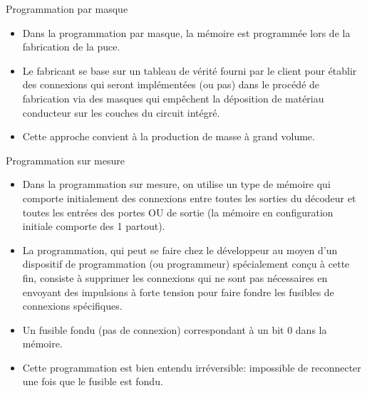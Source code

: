 \documentclass[presentation]{beamer}
\begin{document}
\begin{frame}[label={sec:org1bb626f}]{Programmation par masque}
\begin{itemize}
\item Dans la \alert{programmation par masque}, la mémoire est programmée lors de la fabrication de la puce.

\item Le fabricant se base sur un tableau de vérité fourni par le client pour établir des connexions qui seront implémentées (ou pas) dans le procédé de fabrication via des masques qui empêchent la déposition de matériau conducteur sur les couches du circuit intégré.

\item Cette approche convient à la production de masse à grand volume.
\end{itemize}
\end{frame}

\begin{frame}[label={sec:org29982ae}]{Programmation sur mesure}
\begin{itemize}
\item Dans la \alert{programmation sur mesure}, on utilise un type de mémoire qui comporte initialement des connexions entre toutes les sorties du décodeur et toutes les entrées des portes OU de sortie (la mémoire en configuration initiale comporte des 1 partout).

\item La programmation, qui peut se faire chez le développeur au moyen d'un dispositif de programmation (ou programmeur) spécialement conçu à cette fin, consiste à supprimer les connexions qui ne sont pas nécessaires en envoyant des impulsions à forte tension pour faire fondre les fusibles de connexions spécifiques.

\item Un fusible fondu (pas de connexion) correspondant à un bit 0 dans la mémoire.

\item Cette programmation est bien entendu irréversible: impossible de reconnecter une fois que le fusible est fondu.
\end{itemize}
\end{frame}
\end{document}
